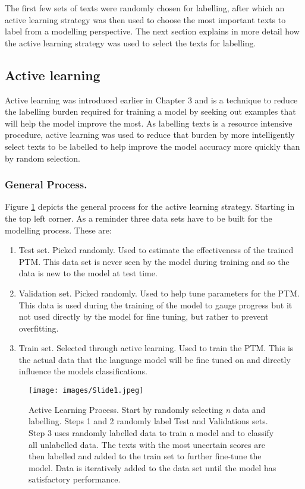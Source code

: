 The first few sets of texts were randomly chosen for labelling, after which an active learning strategy was then used to choose the most important texts to label from a modelling perspective. The next section explains in more detail how the active learning strategy was used to select the texts for labelling.


\subsection{Active learning}Active learning was introduced earlier in Chapter 3 and is a technique to reduce the labelling burden required for training a model by seeking out examples that will help the model improve the most. As labelling texts is a resource intensive procedure, active learning was used to reduce that burden by more intelligently select texts to be labelled to help improve the model accuracy more quickly than by random selection. 


\subsubsection{General Process.}  

Figure \ref{fig:active_process} depicts the general process for the active learning strategy. Starting in the top left corner. As a reminder three data sets have to be built for the modelling process. These are:

\begin{enumerate}
    \item Test set. Picked randomly. Used to estimate the effectiveness of the trained PTM. This data set is never seen by the model during training and so the data is new to the model at test time.
    \item Validation set. Picked randomly. Used to help tune parameters for the PTM. This data is used during the training of the model to gauge progress but it not used directly by the model for fine tuning, but rather to prevent overfitting.
    \item Train set. Selected through active learning. Used to train the PTM. This is the actual data that the language model will be fine tuned on and directly influence the models classifications.
\end{enumerate}

\begin{figure}[!h]
  \centering
    \texttt{[image: images/Slide1.jpeg]}
    \caption[Active Learning Process.]{Active Learning Process. Start by randomly selecting \emph{n} data and labelling. Steps 1 and 2 randomly label Test and Validations sets. Step 3 uses randomly labelled data to train a model and to classify all unlabelled data. The texts with the most uncertain scores are then labelled and added to the train set to further fine-tune the model. Data is iteratively added to the data set until the model has satisfactory performance.}
    \label{fig:active_process}
\end{figure}

